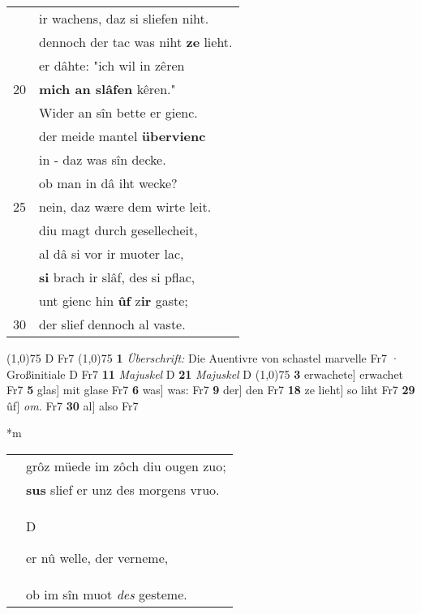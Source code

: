 \documentclass[8pt,a4paper,notitlepage]{article}
\begin{document}
\begin{table}[ht]
\begin{minipage}[t]{0.5\linewidth}
\begin{tabular}{rl}
 & ir wachens, daz si sliefen niht.\\ 
 & dennoch der tac was niht \textbf{ze} lieht.\\ 
 & er dâhte: "ich wil in zêren\\ 
20 & \textbf{mich an slâfen} kêren."\\ 
 & Wider an sîn bette er gienc.\\ 
 & der meide mantel \textbf{übervienc}\\ 
 & in - daz was sîn decke.\\ 
 & ob man in dâ iht wecke?\\ 
25 & nein, daz wære dem wirte leit.\\ 
 & diu magt durch gesellecheit,\\ 
 & al dâ si vor ir muoter lac,\\ 
 & \textbf{si} brach ir slâf, des si pflac,\\ 
 & unt gienc hin \textbf{ûf} z\textbf{ir} gaste;\\ 
30 & der slief dennoch al vaste.\\ 
\end{tabular}
\scriptsize
\line(1,0){75} \newline
D Fr7 \newline
\line(1,0){75} \newline
\textbf{1} \textit{Überschrift:} Die Auentivre von schastel marvelle Fr7  · Großinitiale D Fr7  \textbf{11} \textit{Majuskel} D  \textbf{21} \textit{Majuskel} D  \newline
\line(1,0){75} \newline
\textbf{3} erwachete] erwachet Fr7 \textbf{5} glas] mit glase Fr7 \textbf{6} was] was: Fr7 \textbf{9} der] den Fr7 \textbf{18} ze lieht] so liht Fr7 \textbf{29} ûf] \textit{om.} Fr7 \textbf{30} al] also Fr7 \newline
\end{minipage}
\hspace{0.5cm}
\begin{minipage}[t]{0.5\linewidth}
\small
\begin{center}*m
\end{center}
\begin{tabular}{rl}
 & grôz müede im zôch diu ougen zuo;\\ 
 & \textbf{sus} slief er unz des morgens vruo.\\ 
 & \begin{large}D\end{large}er nû welle, der verneme,\\ 
 & ob im sîn muot \textit{des} gesteme.\\ 

\end{tabular}
\end{minipage}
\end{table}
\end{document}
